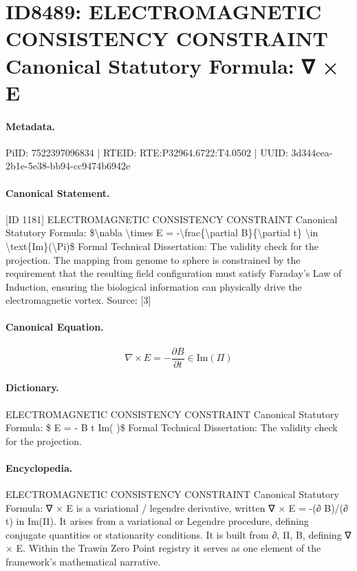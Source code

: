 \section*{ID8489: ELECTROMAGNETIC CONSISTENCY CONSTRAINT Canonical Statutory Formula: ∇ × E}
\paragraph{Metadata.}
PiID: 7522397096834 | RTEID: RTE:P32964.6722:T4.0502 | UUID: 3d344cea-2b1e-5e38-bb94-cc9474b6942e

\paragraph{Canonical Statement.}
[ID 1181] ELECTROMAGNETIC CONSISTENCY CONSTRAINT Canonical Statutory Formula: \$\textbackslash{}nabla \textbackslash{}times E = -\textbackslash{}frac\{\textbackslash{}partial B\}\{\textbackslash{}partial t\} \textbackslash{}in \textbackslash{}text\{Im\}(\textbackslash{}Pi)\$ Formal Technical Dissertation: The validity check for the projection. The mapping from genome to sphere is constrained by the requirement that the resulting field configuration must satisfy Faraday’s Law of Induction, ensuring the biological information can physically drive the electromagnetic vortex. Source: [3]

\paragraph{Canonical Equation.}
\[
\nabla \times E = -\frac{\partial B}{\partial t} \in \text{Im}(\Pi)
\]

\paragraph{Dictionary.}
ELECTROMAGNETIC CONSISTENCY CONSTRAINT Canonical Statutory Formula: \$ E = - B t Im( )\$ Formal Technical Dissertation: The validity check for the projection.

\paragraph{Encyclopedia.}
ELECTROMAGNETIC CONSISTENCY CONSTRAINT Canonical Statutory Formula: ∇ × E is a variational / legendre derivative, written ∇ × E = -(∂ B)/(∂ t) in Im(Π). It arises from a variational or Legendre procedure, defining conjugate quantities or stationarity conditions. It is built from ∂, Π, B, defining ∇ × E. Within the Trawin Zero Point registry it serves as one element of the framework's mathematical narrative.

